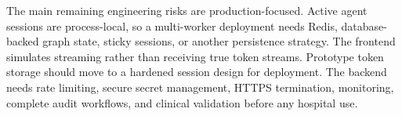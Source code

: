 The main remaining engineering risks are production-focused. Active agent sessions are process-local, so a multi-worker deployment needs Redis, database-backed graph state, sticky sessions, or another persistence strategy. The frontend simulates streaming rather than receiving true token streams. Prototype token storage should move to a hardened session design for deployment. The backend needs rate limiting, secure secret management, HTTPS termination, monitoring, complete audit workflows, and clinical validation before any hospital use.
